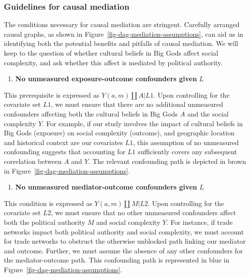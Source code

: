 \documentclass[
  singlecolumn]{report}
\providecommand{\tightlist}{%
  \setlength{\itemsep}{0pt}\setlength{\parskip}{0pt}}\usepackage{longtable,booktabs,array}
\begin{document}
\hypertarget{guidelines-for-causal-mediation}{%
\subsubsection{Guidelines for causal
mediation}\label{guidelines-for-causal-mediation}}

The conditions necessary for causal mediation are stringent. Carefully
arranged causal graphs, as shown in
Figure~\ref{fig-dag-mediation-assumptions}, can aid us in identifying
both the potential benefits and pitfalls of causal mediation. We will
keep to the question of whether cultural beliefs in Big Gods affect
social complexity, and ask whether this affect is mediated by political
authority.

\begin{enumerate}
\def\labelenumi{\arabic{enumi}.}
\tightlist
\item
  \textbf{No unmeasured exposure-outcome confounders given} \(L\)
\end{enumerate}

This prerequisite is expressed as \(Y(a,m) \coprod A | L1\). Upon
controlling for the covariate set \(L1\), we must ensure that there are
no additional unmeasured confounders affecting both the cultural beliefs
in Big Gods \(A\) and the social complexity \(Y\). For example, if our
study involves the impact of cultural beliefs in Big Gods (exposure) on
social complexity (outcome), and geographic location and historical
context are our covariates \(L1\), this assumption of no unmeasured
confounding suggests that accounting for \(L1\) sufficiently covers any
subsequent correlation between \(A\) and \(Y\). The relevant confounding
path is depicted in brown in Figure~\ref{fig-dag-mediation-assumptions}.

\begin{enumerate}
\def\labelenumi{\arabic{enumi}.}
\setcounter{enumi}{1}
\tightlist
\item
  \textbf{No unmeasured mediator-outcome confounders given} \(L\)
\end{enumerate}

This condition is expressed as \(Y(a,m) \coprod M | L2\). Upon
controlling for the covariate set \(L2\), we must ensure that no other
unmeasured confounders affect both the political authority \(M\) and
social complexity \(Y\). For instance, if trade networks impact both
political authority and social complexity, we must account for trade
networks to obstruct the otherwise unblocked path linking our mediator
and outcome. Further, we must assume the absence of any other
confounders for the mediator-outcome path. This confounding path is
represented in blue in Figure~\ref{fig-dag-mediation-assumptions}.
\end{document}
